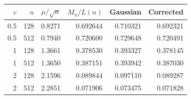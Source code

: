 \begin{tabular}{rr rrrr}
\toprule
$c$ & $n$ & $\mu/\sqrt n$ & $M_n/L(n)$ & Gaussian & Corrected\\
\midrule
0.5 & 128 & 0.8271 & 0.692644 & 0.710321 & 0.692321\\
0.5 & 512 & 0.7940 & 0.720600 & 0.729648 & 0.720491\\
1 & 128 & 1.3661 & 0.378530 & 0.393327 & 0.378145\\
1 & 512 & 1.3650 & 0.387151 & 0.393942 & 0.387030\\
2 & 128 & 2.1596 & 0.089844 & 0.097110 & 0.089287\\
2 & 512 & 2.2851 & 0.071906 & 0.073475 & 0.071828\\
\bottomrule
\end{tabular}
